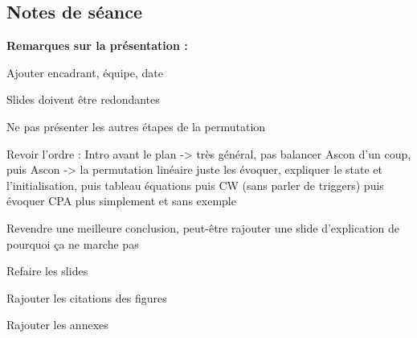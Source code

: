 \documentclass[12pt]{article}
\newcommand{\cmark}{\ding{51}}%
\newcommand{\done}{\rlap{$\square$}{\raisebox{2pt}{\large\hspace{1pt}\cmark}}%
	\hspace{-2.5pt}}
\begin{document}
	\subsection{Notes de séance}
	\textbf{Remarques sur la présentation :} 
	\begin{todolist}
		\item[\done] Ajouter encadrant, équipe, date
		\item[\done] Slides doivent être redondantes
		\item[\done] Ne pas présenter les autres étapes de la permutation
		\item[\done] Revoir l'ordre : Intro avant le plan -> très général, pas balancer Ascon d'un coup, puis Ascon -> la permutation linéaire juste les évoquer, expliquer le state et l'initialisation, puis tableau équations puis CW (sans parler de triggers) puis évoquer CPA plus simplement et sans exemple
		\item[\done] Revendre une meilleure conclusion, peut-être rajouter une slide d'explication de pourquoi ça ne marche pas
		\item[\done] Refaire les slides
		\item[\done] Rajouter les citations des figures
		\item[\done] Rajouter les annexes
	\end{todolist}
	
\end{document}
